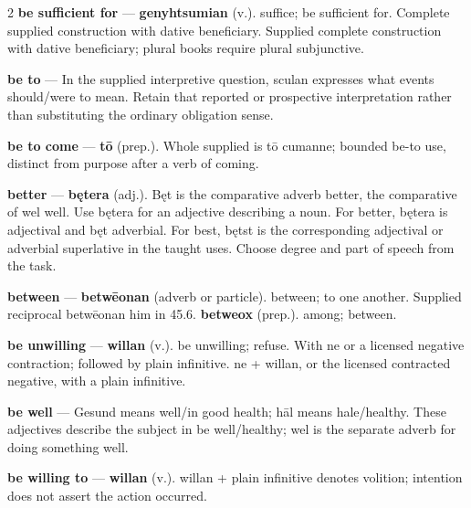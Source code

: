 \begin{multicols}{2}
\textbf{be sufficient for} — \textbf{genyhtsumian} (v.). suffice; be sufficient for. Complete supplied construction with dative beneficiary. Supplied complete construction with dative beneficiary; plural books require plural subjunctive.\par
\textbf{be to} — In the supplied interpretive question, sculan expresses what events should/were to mean. Retain that reported or prospective interpretation rather than substituting the ordinary obligation sense.\par
\textbf{be to come} — \textbf{tō} (prep.). Whole supplied is tō cumanne; bounded be-to use, distinct from purpose after a verb of coming.\par
\textbf{better} — \textbf{bętera} (adj.).  Bęt is the comparative adverb better, the comparative of wel well. Use bętera for an adjective describing a noun. For better, bętera is adjectival and bęt adverbial. For best, bętst is the corresponding adjectival or adverbial superlative in the taught uses. Choose degree and part of speech from the task.\par
\textbf{between} — \textbf{betwēonan} (adverb or particle). between; to one another. Supplied reciprocal betwēonan him in 45.6. \textbf{betweox} (prep.). among; between.\par
\textbf{be unwilling} — \textbf{willan} (v.). be unwilling; refuse. With ne or a licensed negative contraction; followed by plain infinitive. ne + willan, or the licensed contracted negative, with a plain infinitive.\par
\textbf{be well} — Gesund means well/in good health; hāl means hale/healthy. These adjectives describe the subject in be well/healthy; wel is the separate adverb for doing something well.\par
\textbf{be willing to} — \textbf{willan} (v.). willan + plain infinitive denotes volition; intention does not assert the action occurred.\par

\end{multicols}
